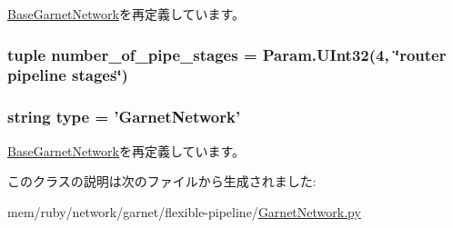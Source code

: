 \hyperlink{classBaseGarnetNetwork_1_1BaseGarnetNetwork_a17da7064bc5c518791f0c891eff05fda}{BaseGarnetNetwork}を再定義しています。\hypertarget{classGarnetNetwork_1_1GarnetNetwork_a0eb24f94968edb05336733b58de25fcf}{
\subsubsection[{number\_\-of\_\-pipe\_\-stages}]{\setlength{\rightskip}{0pt plus 5cm}tuple {\bf number\_\-of\_\-pipe\_\-stages} = Param.UInt32(4, \char`\"{}router pipeline stages\char`\"{})}}
\label{classGarnetNetwork_1_1GarnetNetwork_a0eb24f94968edb05336733b58de25fcf}
\hypertarget{classGarnetNetwork_1_1GarnetNetwork_acce15679d830831b0bbe8ebc2a60b2ca}{
\subsubsection[{type}]{\setlength{\rightskip}{0pt plus 5cm}string {\bf type} = '{\bf GarnetNetwork}'}}
\label{classGarnetNetwork_1_1GarnetNetwork_acce15679d830831b0bbe8ebc2a60b2ca}


\hyperlink{classBaseGarnetNetwork_1_1BaseGarnetNetwork_acce15679d830831b0bbe8ebc2a60b2ca}{BaseGarnetNetwork}を再定義しています。

このクラスの説明は次のファイルから生成されました:\begin{DoxyCompactItemize}
\item 
mem/ruby/network/garnet/flexible-\/pipeline/\hyperlink{GarnetNetwork_8py}{GarnetNetwork.py}\end{DoxyCompactItemize}
